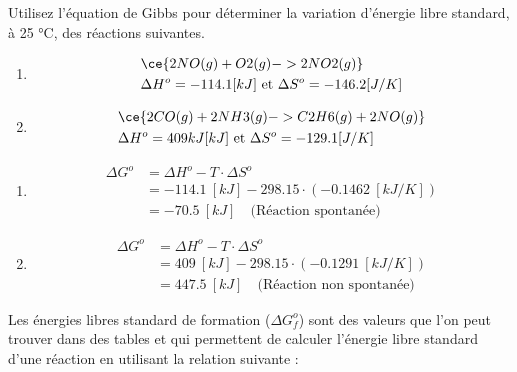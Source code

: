 \documentclass[
  11pt,
  a4paper,
  openany]{book}
\providecommand{\tightlist}{%
  \setlength{\itemsep}{0pt}\setlength{\parskip}{0pt}}
\begin{document}
\begin{Exercise}

Utilisez l'équation de Gibbs pour déterminer la variation d'énergie libre standard, à 25 °C, des réactions suivantes.

\begin{enumerate}
\def\labelenumi{\alph{enumi}.}
\tightlist
\item
  \[
  \begin{split}
  & \ce{2 NO(g) + O2(g) -> 2 NO2(g)} \\
  & \Delta H^o = -114.1 [kJ] \text{ et } \Delta S^o = -146.2 [J/K]
  \end{split}
  \]
\item
  \[
  \begin{split}
  & \ce{2 CO(g) + 2 NH3(g) -> C2H6(g) + 2 NO(g)} \\
  & \Delta H^o = 409 kJ [kJ] \text{ et } \Delta S^o = -129.1 [J/K]
  \end{split}
  \]
\end{enumerate}

\end{Exercise}

\begin{Answer}

\begin{enumerate}
\def\labelenumi{\alph{enumi}.}
\tightlist
\item
  \[
  \begin{split}
  \Delta G^o &= \Delta H^o - T \cdot \Delta S^o \\
  &= -114.1\ [kJ] - 298.15 \cdot (-0.1462\ [kJ/K]) \\
  &= -70.5\ [kJ] \quad \text{(Réaction spontanée)}
  \end{split}
  \]
\item
  \[
  \begin{split}
  \Delta G^o &= \Delta H^o - T \cdot \Delta S^o \\
  &= 409\ [kJ] - 298.15 \cdot (-0.1291\ [kJ/K]) \\
  &= 447.5\ [kJ] \quad \text{(Réaction non spontanée)}
  \end{split}
  \]
\end{enumerate}

\end{Answer}

\clearpage

Les énergies libres standard de formation (\(\Delta G^o_f\)) sont des valeurs que l'on peut trouver dans des tables et qui permettent de calculer l'énergie libre standard d'une réaction en utilisant la relation suivante :
\end{document}
